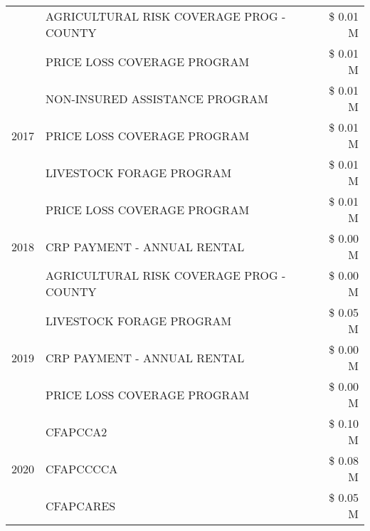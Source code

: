 \begin{tabular}{llr}
 & AGRICULTURAL RISK COVERAGE PROG - COUNTY      & \$ 0.01 M \\
 & PRICE LOSS COVERAGE PROGRAM                   & \$ 0.01 M \\
\cline{1-3}
\multirow[t]{3}{*}{2017} & NON-INSURED ASSISTANCE PROGRAM & \$ 0.01 M \\
 & PRICE LOSS COVERAGE PROGRAM & \$ 0.01 M \\
 & LIVESTOCK FORAGE PROGRAM & \$ 0.01 M \\
\cline{1-3}
\multirow[t]{3}{*}{2018} & PRICE LOSS COVERAGE PROGRAM & \$ 0.01 M \\
 & CRP PAYMENT - ANNUAL RENTAL & \$ 0.00 M \\
 & AGRICULTURAL RISK COVERAGE PROG - COUNTY & \$ 0.00 M \\
\cline{1-3}
\multirow[t]{3}{*}{2019} & LIVESTOCK FORAGE PROGRAM & \$ 0.05 M \\
 & CRP PAYMENT - ANNUAL RENTAL & \$ 0.00 M \\
 & PRICE LOSS COVERAGE PROGRAM & \$ 0.00 M \\
\cline{1-3}
\multirow[t]{3}{*}{2020} & CFAPCCA2 & \$ 0.10 M \\
 & CFAPCCCCA & \$ 0.08 M \\
 & CFAPCARES & \$ 0.05 M \\
\cline{1-3}
\bottomrule
\end{tabular}

